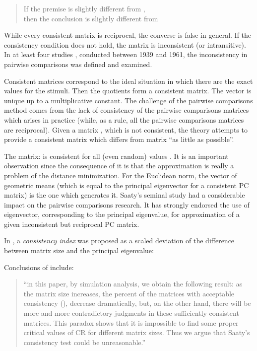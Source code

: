 \documentclass [12pt]{article}
\theoremstyle{definition}
\begin{document}
\begin{quote}
If the premise  is slightly different from , \\
then the conclusion  is slightly different from 
\end{quote}


While every consistent matrix is reciprocal, the converse is false in general. If the consistency condition does not hold, the matrix is inconsistent (or intransitive). In at least four studies \cite{KSB1939, H1953, GS1958, S1961},  conducted between 1939 and 1961, the inconsistency in pairwise comparisons was defined and examined.
   
Consistent matrices correspond to the ideal situation in which there are the exact values  for the stimuli. 
Then the quotients  form a consistent matrix. 
The vector  is unique up to a multiplicative constant. 
The challenge of the pairwise comparisons method comes from the lack of consistency of the pairwise comparisons matrices which arises in practice (while, as a rule, all the pairwise comparisons matrices are reciprocal). Given a  matrix , which is not consistent, the theory attempts to provide a consistent  matrix  which differs from matrix  ``as little as possible''. 

The matrix:  is consistent for all (even random) values . It is an important observation since the consequence of it is that the approximation is really a problem of the distance minimization. For the Euclidean norm, the vector of geometric means (which is equal to the principal eigenvector for a consistent PC matrix) is the one which generates it. 
Saaty's seminal study \cite{Saaty77} had a considerable impact on the pairwise comparisons research. 
It has strongly endorsed the use of eigenvector, corresponding to the principal eigenvalue, for approximation of a given inconsistent but reciprocal PC matrix. 


In \cite{Saaty77}, a {\em consistency index} was proposed as a scaled deviation of the difference between matrix size and the principal eigenvalue:



\begin{flushleft}
Conclusions of \cite{XDXW2008} include:
\end{flushleft}
\begin{quotation}
``in this paper, by simulation analysis, we obtain the following
result: as the matrix size increases, the percent of the matrices
with acceptable consistency (), decrease dramatically,
but, on the other hand, there will be more and more contradictory
judgments in these sufficiently consistent matrices. This paradox
shows that it is impossible to find some proper critical values
of CR for different matrix sizes. Thus we argue that Saaty's
consistency test could be unreasonable.''
\end{quotation}
\end{document}
